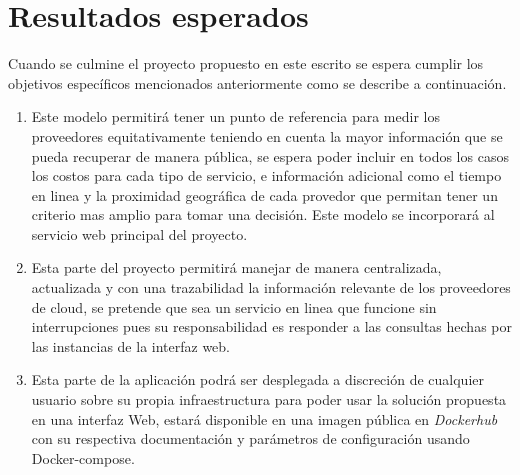\chapter{Resultados esperados} %

\label{ch:resultados} %



Cuando se culmine el proyecto propuesto en este escrito se espera cumplir los objetivos específicos mencionados anteriormente como se describe a continuación.

\begin{enumerate}
  \item Este modelo permitirá tener un punto de referencia para medir los proveedores equitativamente teniendo en cuenta la mayor información que se pueda recuperar de manera pública, se espera poder incluir en todos los casos los costos para cada tipo de servicio, e información adicional como el tiempo en linea y la proximidad geográfica de cada provedor que permitan tener un criterio mas amplio para tomar una decisión. Este modelo se incorporará al servicio web principal del proyecto.
  
  \item Esta parte del proyecto permitirá manejar de manera centralizada, actualizada y con una trazabilidad la información relevante de los proveedores de cloud, se pretende que sea un servicio en linea que funcione sin interrupciones pues su responsabilidad es responder a las consultas hechas por las instancias de la interfaz web.
  
  \item Esta parte de la aplicación podrá ser desplegada a discreción de cualquier usuario sobre su propia infraestructura para poder usar la solución propuesta en una interfaz Web, estará disponible en una imagen pública en \textit{Dockerhub} con su respectiva documentación y parámetros de configuración usando \acs{Docker-compose}.
  
\end{enumerate}


      
